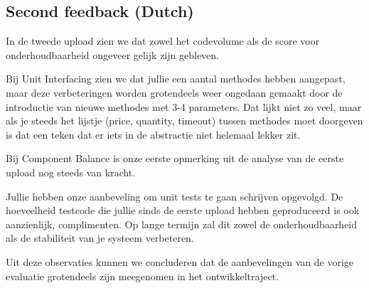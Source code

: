 \subsection{Second feedback (Dutch)}

In de tweede upload zien we dat zowel het codevolume als de score voor onderhoudbaarheid ongeveer gelijk zijn gebleven.

Bij Unit Interfacing zien we dat jullie een aantal methodes hebben aangepast, maar deze verbeteringen worden grotendeels weer ongedaan gemaakt door de introductie van nieuwe methodes met 3-4 parameters.
Dat lijkt niet zo veel, maar als je steeds het lijstje (price, quantity, timeout) tussen methodes moet doorgeven is dat een teken dat er iets in de abstractie niet helemaal lekker zit.

Bij Component Balance is onze eerste opmerking uit de analyse van de eerste upload nog steeds van kracht.

Jullie hebben onze aanbeveling om unit tests te gaan schrijven opgevolgd.
De hoeveelheid testcode die jullie sinds de eerste upload hebben geproduceerd is ook aanzienlijk, complimenten.
Op lange termijn zal dit zowel de onderhoudbaarheid als de stabiliteit van je systeem verbeteren.

Uit deze observaties kunnen we concluderen dat de aanbevelingen van de vorige evaluatie grotendeels zijn meegenomen in het ontwikkeltraject.